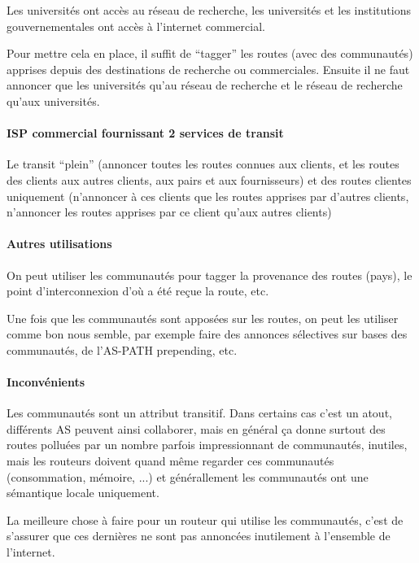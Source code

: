 \documentclass{article}
\begin{document}
\begin{sffamily}
Les universités ont accès au réseau de recherche, les universités et
les institutions gouvernementales ont accès à l'internet commercial.

Pour mettre cela en place, il suffit de ``tagger'' les routes (avec
des communautés) apprises depuis des destinations de recherche ou
commerciales. Ensuite il ne faut annoncer que les universités qu'au
réseau de recherche et le réseau de recherche qu'aux universités.

\paragraph{ISP commercial fournissant 2 services de transit}

Le transit ``plein'' (annoncer toutes les routes connues aux clients,
et les routes des clients aux autres clients, aux pairs et aux
fournisseurs) et des routes clientes uniquement (n'annoncer à ces
clients que les routes apprises par d'autres clients, n'annoncer les
routes apprises par ce client qu'aux autres clients)

\paragraph{Autres utilisations}

On peut utiliser les communautés pour tagger la provenance des routes
(pays), le point d'interconnexion d'où a été reçue la route, etc.

Une fois que les communautés sont apposées sur les routes, on peut les
utiliser comme bon nous semble, par exemple faire des annonces
sélectives sur bases des communautés, de l'AS-PATH prepending, etc.

\paragraph{Inconvénients}

Les communautés sont un attribut transitif. Dans certains cas c'est un
atout, différents AS peuvent ainsi collaborer, mais en général ça
donne surtout des routes polluées par un nombre parfois impressionnant
de communautés, inutiles, mais les routeurs doivent quand même
regarder ces communautés (consommation, mémoire, ...) et générallement
les communautés ont une sémantique locale uniquement.

La meilleure chose à faire pour un routeur qui utilise les
communautés, c'est de s'assurer que ces dernières ne sont pas
annoncées inutilement à l'ensemble de l'internet.


\end{sffamily}
\end{document}
